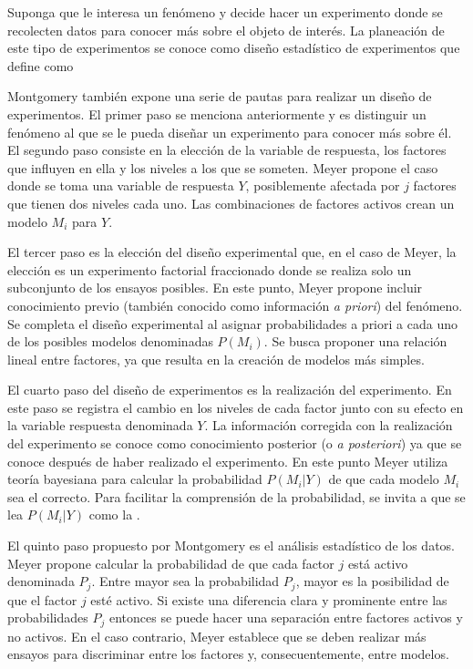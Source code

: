 Suponga que le interesa un fenómeno y decide hacer un experimento donde se recolecten datos para conocer más sobre el objeto de interés. La planeación de este tipo de experimentos se conoce como diseño estadístico de experimentos que \cite{montgomery2017design} define como 

Montgomery también expone una serie de pautas para realizar un diseño de experimentos. El primer paso se menciona anteriormente y es distinguir un fenómeno al que se le pueda diseñar un experimento para conocer más sobre él. El segundo paso consiste en la elección de la variable de respuesta, los factores que influyen en ella y los niveles a los que se someten. Meyer propone el caso donde se toma una variable de respuesta $Y$, posiblemente afectada por $j$ factores que tienen dos niveles cada uno. Las combinaciones de factores activos crean un modelo $M_i$ para $Y$.

El tercer paso es la elección del diseño experimental que, en el caso de Meyer, la elección es un experimento factorial fraccionado donde se realiza solo un subconjunto de los ensayos posibles. En este punto, Meyer propone incluir conocimiento previo (también conocido como información \textit{a priori}) del fenómeno. Se completa el diseño experimental al asignar probabilidades a priori a cada uno de los posibles modelos denominadas $P(M_i)$. Se busca proponer una relación lineal entre factores, ya que resulta en la creación de modelos más simples. 

El cuarto paso del diseño de experimentos es la realización del experimento. En este paso se registra el cambio en los niveles de cada factor junto con su efecto en la variable respuesta denominada $Y$. La información corregida con la realización del experimento se conoce como conocimiento posterior (o \textit{a posteriori}) ya que se conoce después de haber realizado el experimento. En este punto Meyer utiliza teoría bayesiana para calcular la probabilidad $P(M_i | Y)$ de que cada modelo $M_i$ sea el correcto. Para facilitar la comprensión de la probabilidad, se invita a que se lea $P(M_i | Y)$ como la . 

El quinto paso propuesto por Montgomery es el análisis estadístico de los datos. Meyer propone calcular la probabilidad de que cada factor $j$ está activo denominada $P_j$. Entre mayor sea la probabilidad $P_j$, mayor es la posibilidad de que el factor $j$ esté activo. Si existe una diferencia clara y prominente entre las probabilidades $P_j$ entonces se puede hacer una separación entre factores activos y no activos. En el caso contrario, Meyer establece que se deben realizar más ensayos para discriminar entre los factores y, consecuentemente, entre modelos. 

